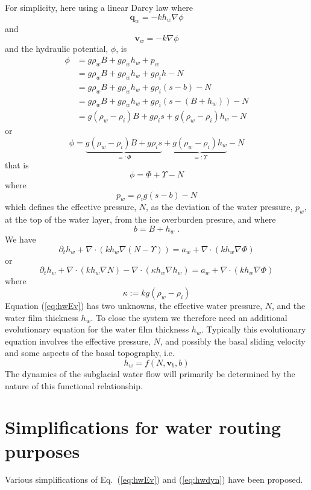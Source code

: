 \documentclass[10pt,a4paper]{article}
\begin{document}
For simplicity, here using a linear Darcy law where
\[
\bm{q}_w = -k h_w \nabla \phi
\]
and 
\[
\bm{v}_w= - k \nabla \phi
\]
and the hydraulic potential, $\phi$, is
\begin{align}
  \phi & = g \rho_w B + g \rho_w h_w + p_w  \label{eq:phi1} \\
  & = g \rho_w B + g \rho_w h_w + g \rho_i h - N \nonumber \\
    & = g \rho_w B + g \rho_w h_w + g \rho_i (s-b) - N \nonumber \\
  & = g \rho_w B + g \rho_w h_w + g \rho_i (s-(B+h_w))  - N \nonumber \\
  & = g (\rho_w-\rho_i) B + g \rho_i s +  g (\rho_w-\rho_i)  h_w  - N \label{eq:phi2}
\end{align}
or
\[
  \phi = \underbrace{g (\rho_w-\rho_i) B + g \rho_i s}_{=:\Phi} +  \underbrace{g (\rho_w-\rho_i)  h_w}_{=:\Upsilon}  - N 
  \]
that is
\[
\phi=\Phi + \Upsilon - N 
\]
where
\[
p_w=\rho_i g (s-b) -N
\]
which defines the effective pressure, $N$, as the deviation of the
water pressure, $p_w$, at the top of the water layer, from the ice
overburden presure, and where
\[
b=B+h_w \; .
\]
We have
\[
\partial_t h_w  + \nabla \cdot (k h_w \nabla (N-\Upsilon)) = a_w + \nabla \cdot (k h_w \nabla \Phi )
\]
or
\begin{equation}
\partial_t h_w  + \nabla \cdot (k h_w \nabla N) - \nabla \cdot ( \kappa h_w \nabla h_w ) = a_w + \nabla \cdot (k h_w \nabla \Phi )
\label{eq:hwEv}
\end{equation}
where
\[
\kappa:= k g (\rho_w-\rho_i)
\]
Equation (\ref{eq:hwEv}) has two unknowns, the effective water
pressure, $N$, and the water film thickness $h_w$. To close the system
we therefore need an additional evolutionary equation for the water
film thickness $h_w$. Typically this evolutionary equation involves the
effective pressure, $N$, and possibly the basal sliding velocity and
some aspects of the basal topography, i.e.\
\begin{equation}
h_w=f(N,\bm{v}_b,b)
\label{eq:hwdyn}
\end{equation}
The dynamics of the subglacial water flow will primarily be
determined by the nature of this functional relationship.

\section{Simplifications for water routing purposes}

Various simplifications of Eq.~(\ref{eq:hwEv}) and (\ref{eq:hwdyn})
have been proposed.
\end{document}
